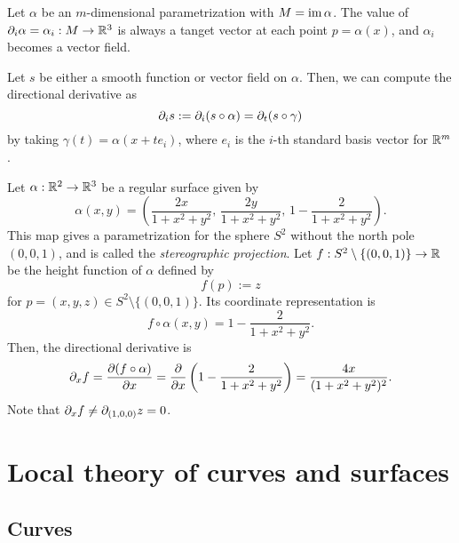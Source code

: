 \documentclass{../note}
\def\a{\alpha}
\begin{document}
\begin{ex} %
\begin{parts}
\item
Let $\a$ be an $m$-dimensional parametrization with $M=\im\a$.
The value of $\pd_i\a=\a_i:M\to\R^3$ is always a tanget vector at each point $p=\a(x)$, and $\a_i$ becomes a vector field.

Let $s$ be either a smooth function or vector field on $\a$.
Then, we can compute the directional derivative as
\[\pd_is:=\pd_i(s\circ\a)=\pd_t(s\circ\gamma)\]
by taking $\gamma(t)=\a(x+te_i)$, where $e_i$ is the $i$-th standard basis vector for $\mathbb{R}^m$.

\item
Let $\a:\R^2\to\R^3$ be a regular surface given by
\[\a(x,y)=\left(\frac{2x}{1+x^2+y^2},\,\frac{2y}{1+x^2+y^2},\,1-\frac2{1+x^2+y^2}\right).\]
This map gives a parametrization for the sphere $S^2$ without the north pole $(0,0,1)$, and is called the \emph{stereographic projection}.
Let $f:S^2\setminus\{(0,0,1)\}\to\mathbb{R}$ be the height function of $\a$ defined by
\[f(p):=z\]
for $p=(x,y,z)\in S^2\setminus\{(0,0,1)\}$.
Its coordinate representation is
\[f\circ\a(x,y)=1-\frac2{1+x^2+y^2}.\]
Then, the directional derivative is
\[\pd_xf=\pd{(f\circ\a)}{x}=\pd{x}\left(1-\frac2{1+x^2+y^2}\right)=\frac{4x}{(1+x^2+y^2)^2}.\]
Note that $\pd_xf\ne\pd_{(1,0,0)}z=0$.
\end{parts}
\end{ex}






























\part{Local theory of curves and surfaces}

\chapter{Curves}
\end{document}
